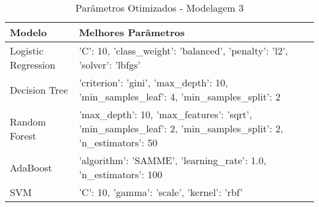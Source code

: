 \begin{table}[H] %
    \centering
    \caption{Parâmetros Otimizados - Modelagem 3}
    \label{tab:melhores_parametros_modelagem_3}
    \renewcommand{\arraystretch}{1.25} %
    \begin{adjustwidth}{ -1in }{ -1in } %
    \centering %
    \small %
    \begin{tabular}{ll}
\toprule
             Modelo &                                                                                          Melhores Parâmetros \\
\midrule
Logistic Regression &                                    {'C': 10, 'class_weight': 'balanced', 'penalty': 'l2', 'solver': 'lbfgs'} \\
      Decision Tree &                        {'criterion': 'gini', 'max_depth': 10, 'min_samples_leaf': 4, 'min_samples_split': 2} \\
      Random Forest & {'max_depth': 10, 'max_features': 'sqrt', 'min_samples_leaf': 2, 'min_samples_split': 2, 'n_estimators': 50} \\
           AdaBoost &                                            {'algorithm': 'SAMME', 'learning_rate': 1.0, 'n_estimators': 100} \\
                SVM &                                                                 {'C': 10, 'gamma': 'scale', 'kernel': 'rbf'} \\
\bottomrule
\end{tabular}
    \end{adjustwidth}
    \renewcommand{\arraystretch}{1.0} %
\end{table}
